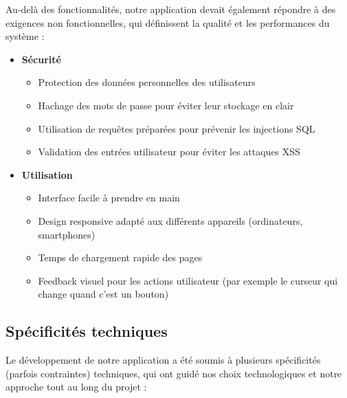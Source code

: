 \documentclass[a4paper,12pt]{article}
\begin{document}
Au-delà des fonctionnalités, notre application devait également répondre à des exigences non fonctionnelles, qui définissent la qualité et les performances du système :

\begin{itemize}
  \item \textbf{Sécurité}
  \begin{itemize}
    \item Protection des données personnelles des utilisateurs
    \item Hachage des mots de passe pour éviter leur stockage en clair
    \item Utilisation de requêtes préparées pour prévenir les injections SQL
    \item Validation des entrées utilisateur pour éviter les attaques XSS
  \end{itemize}

  \item \textbf{Utilisation}
  \begin{itemize}
    \item Interface facile à prendre en main
    \item Design responsive adapté aux différents appareils (ordinateurs, smartphones)
    \item Temps de chargement rapide des pages
    \item Feedback visuel pour les actions utilisateur (par exemple le curseur qui change quand c'est un bouton)
  \end{itemize}
\end{itemize}

\subsection{Spécificités techniques}

Le développement de notre application a été soumis à plusieurs spécificités (parfois contraintes) techniques, qui ont guidé nos choix technologiques et notre approche tout au long du projet :
\end{document}
